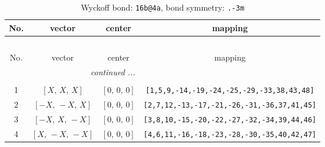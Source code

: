 \documentclass[fleqn,8pt]{jsarticle}
\begin{document}
\begin{longtable}{cccc}
\caption{Wyckoff bond: {\tt 16b@4a}, bond symmetry: {\tt .-3m}}
 \\
 \hline \hline
No. & vector & center & mapping \\ \hline \endfirsthead

\multicolumn{3}{l}{\tablename\ \thetable{}} \\
 \hline \hline
No. & vector & center & mapping \\ \hline \endhead

 \hline \hline
\multicolumn{3}{r}{\footnotesize\it continued ...} \\ \endfoot

 \hline \hline
\multicolumn{3}{r}{} \\ \endlastfoot

1 & $\left[ X,\, X,\, X \right]$ & $\left[ 0,\, 0,\, 0 \right]$ & {\tt [1,5,9,-14,-19,-24,-25,-29,-33,38,43,48]} \\ \hline
2 & $\left[ - X,\, - X,\, X \right]$ & $\left[ 0,\, 0,\, 0 \right]$ & {\tt [2,7,12,-13,-17,-21,-26,-31,-36,37,41,45]} \\ \hline
3 & $\left[ - X,\, X,\, - X \right]$ & $\left[ 0,\, 0,\, 0 \right]$ & {\tt [3,8,10,-15,-20,-22,-27,-32,-34,39,44,46]} \\ \hline
4 & $\left[ X,\, - X,\, - X \right]$ & $\left[ 0,\, 0,\, 0 \right]$ & {\tt [4,6,11,-16,-18,-23,-28,-30,-35,40,42,47]} \\
\end{longtable}
\renewcommand{\arraystretch}{1.2}
\end{document}
